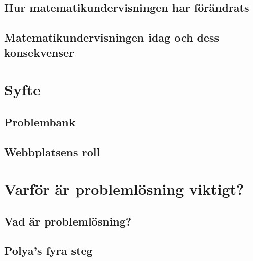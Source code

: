 \documentclass[11pt,a4paper]{article}
\begin{document}
    \subsection{Hur matematikundervisningen har förändrats}
        \label{sec:Forandring.tex}
        
        
    \subsection{Matematikundervisningen idag och dess konsekvenser}
        
        
%        

\section{Syfte}
    
    
    \subsection{Problembank}
        
    
    \subsection{Webbplatsens roll}
        
\section{Varför är problemlösning viktigt?}
    \label{sec:Teori}
    
        
    \subsection{Vad är problemlösning?}
        \label{sec:problemdef}
        
        
    \subsection{Polya's fyra steg}
        \label{sec:polya}
        
        
\end{document}
